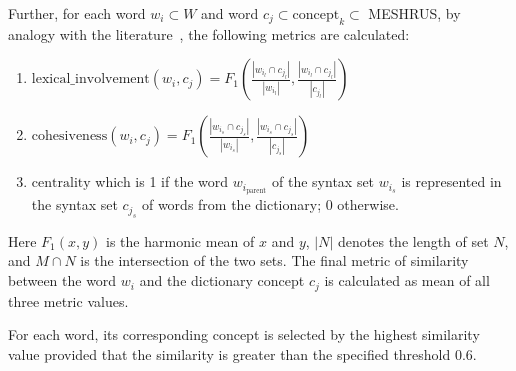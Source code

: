 \documentclass[a4paper,fleqn,longmktitle]{cas-dc}
\begin{document}
Further, for each word $w_{i}\subset W$ and word $c_{j}\subset \text{concept}_{k}\subset$ MESHRUS, by analogy with the literature~\cite{shelmanov2015information}, the following metrics are calculated:
\begin{enumerate}
	\item $\mathrm{lexical\_involvement}(w_{i}, c_{j}) = F_1 \left(\frac{|w_{i_l}\cap c_{j_l}|}{|w_{i_l}|}, \frac{|w_{i_l}\cap c_{j_l}|}{|c_{j_l}|} \right)$
	\item $\mathrm{cohesiveness}(w_{i}, c_{j}) = F_1 \left(\frac{|w_{i_s}\cap c_{j_s}|}{|w_{i_s}|}, \frac{|w_{i_s}\cap c_{j_s}|}{|c_{j_s}|} \right)$
    \item $\mathrm{centrality}$ which is 1 if the word $w_{i_\mathrm{parent}}$ of the syntax set $w_{i_s}$ is represented in the syntax set $c_{j_s}$ of words from the dictionary; 0 otherwise.
\end{enumerate}
Here $F_{1}(x, y)$ is the harmonic mean of $x$ and $y$, $|N|$ denotes the length of set $N$, and $M \cap N$ is the intersection of the two sets.
The final metric of similarity between the word $w_i$ and the dictionary concept $c_j$ is calculated as mean of all three metric values.

For each word, its corresponding concept is selected by the highest similarity value provided that the similarity is greater than the specified threshold 0.6. 

\end{document}
